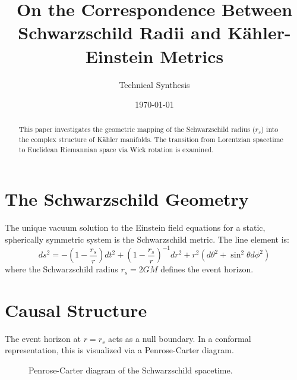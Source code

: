 \documentclass[11pt, letterpaper]{article}
\title{\textbf{On the Correspondence Between Schwarzschild Radii and K{\"a}hler-Einstein Metrics}}
\author{Technical Synthesis}
\date{\today}
\newcommand{\rs}{r_s}
\begin{document}
\maketitle

\begin{abstract}
This paper investigates the geometric mapping of the Schwarzschild radius ($\rs$) into the complex structure of K{\"a}hler manifolds. The transition from Lorentzian spacetime to Euclidean Riemannian space via Wick rotation is examined.
\end{abstract}

\section{The Schwarzschild Geometry}
The unique vacuum solution to the Einstein field equations for a static, spherically symmetric system is the Schwarzschild metric. The line element is:
\begin{equation}
    ds^2 = -\left(1 - \frac{\rs}{r}\right) dt^2 + \left(1 - \frac{\rs}{r}\right)^{-1} dr^2 + r^2 (d\theta^2 + \sin^2\theta d\phi^2)
\end{equation}
where the Schwarzschild radius $\rs = 2GM$ defines the event horizon. 



\section{Causal Structure}
The event horizon at $r = \rs$ acts as a null boundary. In a conformal representation, this is visualized via a Penrose-Carter diagram.

\begin{figure}[h]
    \centering
    \caption{Penrose-Carter diagram of the Schwarzschild spacetime.}
\end{figure}
\end{document}
